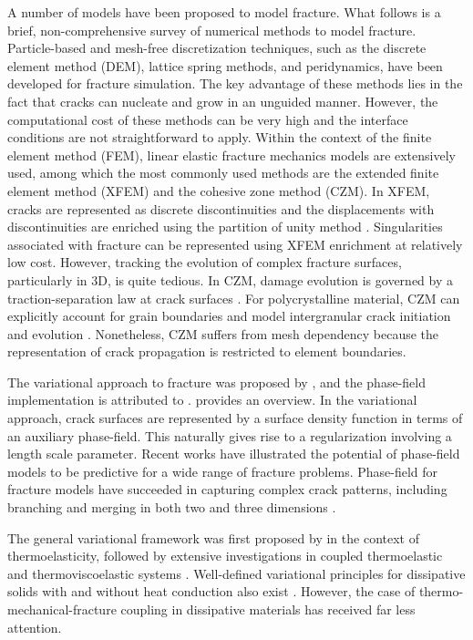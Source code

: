 A number of models have been proposed to model fracture. What follows is a brief, non-comprehensive survey of numerical methods to model fracture. Particle-based and mesh-free discretization techniques, such as the discrete element method (DEM), lattice spring methods, and peridynamics, have been developed for fracture simulation. The key advantage of these methods lies in the fact that cracks can nucleate and grow in an unguided manner. However, the computational cost of these methods can be very high and the interface conditions are not straightforward to apply. Within the context of the finite element method (FEM), linear elastic fracture mechanics models are extensively used, among which the most commonly used methods are the extended finite element method (XFEM) and the cohesive zone method (CZM). In XFEM, cracks are represented as discrete discontinuities and the displacements with discontinuities are enriched using the partition of unity method \cite{babuaka1997, Dolbow99}. Singularities associated with fracture can be represented using XFEM enrichment at relatively low cost. However, tracking the evolution of complex fracture surfaces, particularly in 3D, is quite tedious. In CZM, damage evolution is governed by a traction-separation law at crack surfaces \cite{needleman_1992, ortiz_1999}. For polycrystalline material, CZM can explicitly account for grain boundaries and model intergranular crack initiation and evolution \cite{KAMAYA2007, KAMAYA2009}. Nonetheless, CZM suffers from mesh dependency because the representation of crack propagation is restricted to element boundaries.

The variational approach to fracture was proposed by \citet{Francfort98}, and the phase-field implementation is attributed to \citet{Bourdin2000}.
\citet{bourdin2008variational} provides an overview.  In the variational approach, crack surfaces are represented by a surface density function in terms of an auxiliary phase-field. This naturally gives rise to a regularization involving a length scale parameter. Recent works have illustrated the potential of phase-field models to be predictive for a wide range of fracture problems. Phase-field for fracture models have succeeded in capturing complex crack patterns, including branching and merging in both two and three dimensions \cite{karma_2001, karma_2004, henry_2004, spatschek_2007, amor_2009}.

The general variational framework was first proposed by \citet{biot1956thermoelasticity} in the context of thermoelasticity, followed by extensive investigations in coupled thermoelastic and thermoviscoelastic systems \cite{herrmann1963variational,ben1965variational,oden2012variational,molinari1987global,batra1989principle,matsubara2021variationally}. Well-defined variational principles for dissipative solids with and without heat conduction also exist \cite{ortiz_1999,yang2006variational}. However, the case of thermo-mechanical-fracture coupling in dissipative materials has received far less attention.

